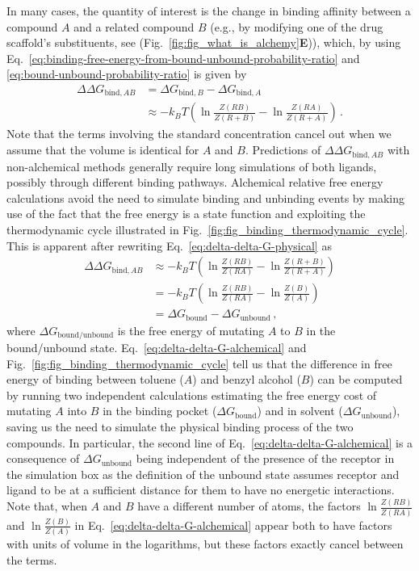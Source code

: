 \documentclass[9pt,bestpractices,pubversion]{livecoms}
\begin{document}
In many cases, the quantity of interest is the change in binding affinity between a compound $A$ and a related compound $B$ (e.g., by modifying one of the drug scaffold's substituents, see (Fig.~\ref{fig:fig_what_is_alchemy}\textbf{E})), which, by using Eq.~\ref{eq:binding-free-energy-from-bound-unbound-probability-ratio} and \ref{eq:bound-unbound-probability-ratio} is given by
\begin{equation}\label{eq:delta-delta-G-physical}
\begin{split}
    \Delta \Delta G_{\mathrm{bind}, AB} &= \Delta G_{\mathrm{bind}, B} - \Delta G_{\mathrm{bind}, A} \\
    &\approx -k_BT \left( \ln \frac{Z(RB)}{Z(R+B)} - \ln \frac{Z(RA)}{Z(R+A)} \right) \, .
\end{split}
\end{equation}
Note that the terms involving the standard concentration cancel out when we assume that the volume is identical for $A$ and $B$.
Predictions of $\Delta \Delta G_{\mathrm{bind}, AB}$ with non-alchemical methods generally require long simulations of both ligands, possibly through different binding pathways.
Alchemical relative free energy calculations avoid the need to simulate binding and unbinding events by making use of the fact that the free energy is a state function and exploiting the thermodynamic cycle illustrated in Fig.~\ref{fig:fig_binding_thermodynamic_cycle}.
This is apparent after rewriting Eq.~\ref{eq:delta-delta-G-physical} as
\begin{equation}\label{eq:delta-delta-G-alchemical}
\begin{split}
    \Delta \Delta G_{\mathrm{bind}, AB} &\approx -k_BT \left( \ln \frac{Z(RB)}{Z(RA)} - \ln \frac{Z(R+B)}{Z(R+A)} \right) \\
    &= -k_BT \left( \ln \frac{Z(RB)}{Z(RA)} - \ln \frac{Z(B)}{Z(A)} \right) \\
    &= \Delta G_{\mathrm{bound}} - \Delta G_{\mathrm{unbound}} \, ,
\end{split}
\end{equation}
where $\Delta G_{\mathrm{bound/unbound}}$ is the free energy of mutating $A$ to $B$ in the bound/unbound state.
Eq.~\ref{eq:delta-delta-G-alchemical} and Fig.~\ref{fig:fig_binding_thermodynamic_cycle} tell us that the difference in free energy of binding between toluene ($A$) and benzyl alcohol ($B$) can be computed by running two independent calculations estimating the free energy cost of mutating $A$ into $B$ in the binding pocket ($\Delta G_{\mathrm{bound}}$) and in solvent ($\Delta G_{\mathrm{unbound}}$), saving us the need to simulate the physical binding process of the two compounds.
In particular, the second line of Eq.~\ref{eq:delta-delta-G-alchemical} is a consequence of $\Delta G_{\mathrm{unbound}}$ being independent of the presence of the receptor in the simulation box as the definition of the unbound state assumes receptor and ligand to be at a sufficient distance for them to have no energetic interactions.
Note that, when $A$ and $B$ have a different number of atoms, the factors $ \ln \frac{Z(RB)}{Z(RA)}$ and $\ln \frac{Z(B)}{Z(A)}$ in   Eq.~\ref{eq:delta-delta-G-alchemical} appear both to have factors with units of volume in the logarithms, but these factors exactly cancel between the terms.
\end{document}
